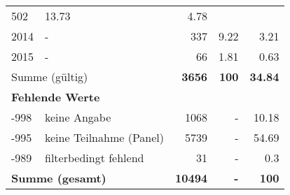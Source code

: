 \begin{longtable}{lXrrr}
       \num{502} &
       \num[round-mode=places,round-precision=2]{13.73} &
         \num[round-mode=places,round-precision=2]{4.78} \\

     2014 &
     \multicolumn{1}{X}{ -  } &


       \num{337} &
       \num[round-mode=places,round-precision=2]{9.22} &
         \num[round-mode=places,round-precision=2]{3.21} \\

     2015 &
     \multicolumn{1}{X}{ -  } &


       \num{66} &
       \num[round-mode=places,round-precision=2]{1.81} &
         \num[round-mode=places,round-precision=2]{0.63} \\
     \midrule
     \multicolumn{2}{l}{Summe (gültig)} &
       \textbf{\num{3656}} &
     \textbf{\num{100}} &
       \textbf{\num[round-mode=places,round-precision=2]{34.84}} \\
     \multicolumn{5}{l}{\textbf{Fehlende Werte}}\\
       -998 &
       keine Angabe &
         \num{1068} &
        - &
         \num[round-mode=places,round-precision=2]{10.18} \\
       -995 &
       keine Teilnahme (Panel) &
         \num{5739} &
        - &
         \num[round-mode=places,round-precision=2]{54.69} \\
       -989 &
       filterbedingt fehlend &
         \num{31} &
        - &
         \num[round-mode=places,round-precision=2]{0.3} \\
     \midrule
     \multicolumn{2}{l}{\textbf{Summe (gesamt)}} &
          \textbf{\num{10494}} &
        \textbf{-} &
        \textbf{\num{100}} \\
     \bottomrule
     \end{longtable}
     
